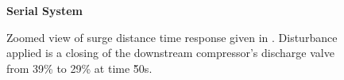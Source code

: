 \begin{figure}
  {\centering\large\textbf{Serial System}\\[1em]}
  \begin{subfigure}{0.48\linewidth}
    \footnotesize
    
    \normalsize
  \end{subfigure}
  \hfill
  \begin{subfigure}{0.48\linewidth}
    \footnotesize
    
    \normalsize
  \end{subfigure}
  \caption[Zoom of surge distance time response.]{Zoomed view of surge distance time response given in . 
  Disturbance applied is a closing of the downstream compressor's discharge valve from 39\% to 29\% at time \u{50}{s}.}
  \label{fig:res:serial-sd-zoom}
\end{figure}
\fi


